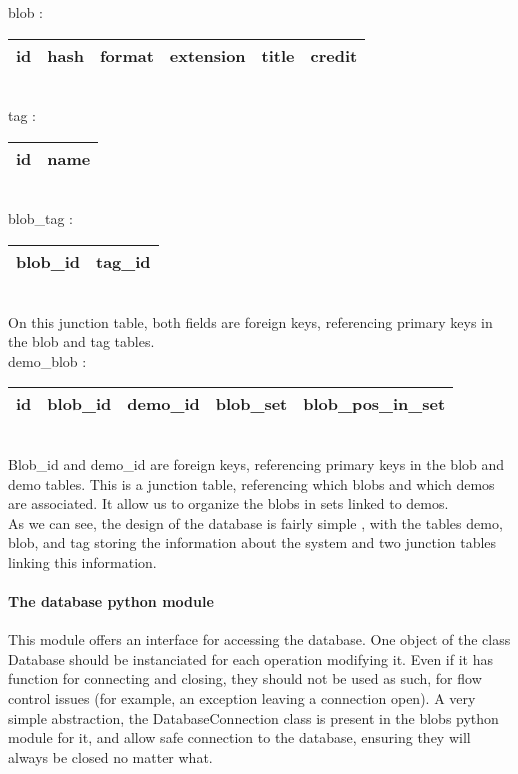 blob :

\begin{tabular}{ | l | l | l | l | l | l | }
  \hline
  id & hash & format & extension & title & credit \\
  \hline
\end{tabular}\\

tag :

\begin{tabular}{ | l | l | }
  \hline
  id & name \\
  \hline
\end{tabular}\\

blob\_tag :

\begin{tabular}{ | l | l | }
  \hline
  blob\_id & tag\_id \\
  \hline
\end{tabular}\\
On this junction table, both fields are foreign keys, referencing primary keys in the blob and tag tables.\\

demo\_blob :

\begin{tabular}{ | l | l | l | l | l | }
  \hline
  id & blob\_id & demo\_id & blob\_set & blob\_pos\_in\_set \\
  \hline
\end{tabular}\\
Blob\_id and demo\_id are foreign keys, referencing primary keys in the blob and demo tables. This is a junction table, referencing which blobs and which demos are associated. It allow us to organize the blobs in sets linked to demos.\\

As we can see, the design of the database is fairly simple , with the tables demo, blob, and tag storing the information about the system and two junction tables linking this information.

\paragraph{The database python module\\}
This module offers an interface for accessing the database. One object of the class Database should be instanciated for each operation modifying it. Even if it has function for connecting and closing, they should not be used as such, for flow control issues (for example, an exception leaving a connection open). A very simple abstraction, the DatabaseConnection class is present in the blobs python module for it, and allow safe connection to the database, ensuring they will always be closed no matter what. \\

